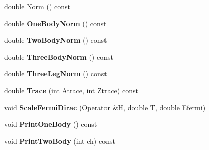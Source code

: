 \begin{DoxyCompactItemize}
\item 
double \hyperlink{classOperator_acb9d7959232a636191b91f6bf5b7b0c8}{Norm} () const 
\item 
\hypertarget{classOperator_a72dc7aea85c7775097d235de6f17f330}{double {\bfseries One\-Body\-Norm} () const }\label{classOperator_a72dc7aea85c7775097d235de6f17f330}

\item 
\hypertarget{classOperator_af1c40bdef64ec9abd5d95e8328565a67}{double {\bfseries Two\-Body\-Norm} () const }\label{classOperator_af1c40bdef64ec9abd5d95e8328565a67}

\item 
\hypertarget{classOperator_a7fbb9851b2e23b0ce3165d7a0707a543}{double {\bfseries Three\-Body\-Norm} () const }\label{classOperator_a7fbb9851b2e23b0ce3165d7a0707a543}

\item 
\hypertarget{classOperator_afba0417c4442e6f83782127c6f2927a8}{double {\bfseries Three\-Leg\-Norm} () const }\label{classOperator_afba0417c4442e6f83782127c6f2927a8}

\item 
\hypertarget{classOperator_a349c80a3302de71eda14bae2e41e941e}{double {\bfseries Trace} (int Atrace, int Ztrace) const }\label{classOperator_a349c80a3302de71eda14bae2e41e941e}

\item 
\hypertarget{classOperator_a1dac4ba672e0c86f79320b28c210e9a5}{void {\bfseries Scale\-Fermi\-Dirac} (\hyperlink{classOperator}{Operator} \&H, double T, double Efermi)}\label{classOperator_a1dac4ba672e0c86f79320b28c210e9a5}

\item 
\hypertarget{classOperator_a5ec5a8110337108ac31d3af7337e454b}{void {\bfseries Print\-One\-Body} () const }\label{classOperator_a5ec5a8110337108ac31d3af7337e454b}

\item 
\hypertarget{classOperator_a905e42cefafaca0eb155cf41b3cd37b8}{void {\bfseries Print\-Two\-Body} (int ch) const }\label{classOperator_a905e42cefafaca0eb155cf41b3cd37b8}

\end{DoxyCompactItemize}
